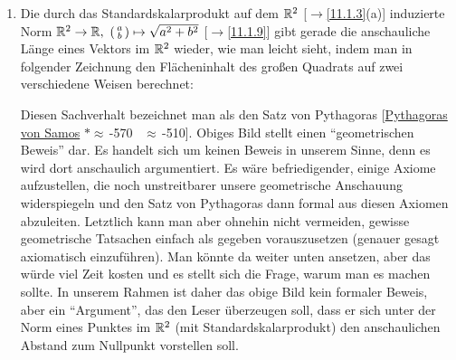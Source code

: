 \documentclass[../../main.tex]{subfiles}
\begin{document}
\begin{bem}\label{11.1.12}
\begin{enumerate}[\normalfont(a)]
\item Die durch das Standardskalarprodukt auf dem $\mathbb R^2$ [$\to$\ref{11.1.3}(a)] induzierte Norm $\R^2\to\R,\ (\begin{smallmatrix}a\\b\end{smallmatrix})\mapsto\sqrt{a^2+b^2}$
[$\to$\ref{11.1.9}]
gibt gerade die anschauliche Länge eines Vektors im $\mathbb R^2$ wieder, wie man leicht sieht, indem man in folgender Zeichnung den Flächeninhalt des großen Quadrats auf
zwei verschiedene Weisen berechnet:
\begin{center}
\end{center}
Diesen Sachverhalt bezeichnet man als den Satz von Pythagoras [\href{http://de.wikipedia.org/wiki/Pythagoras}{Pythagoras von Samos} $*\approx$\,-570 \dag~$\approx$\,-510]. Obiges Bild stellt einen "`geometrischen
Beweis"' dar. Es handelt sich um keinen Beweis in unserem Sinne, denn es wird dort anschaulich argumentiert. Es wäre befriedigender, einige Axiome aufzustellen, die noch unstreitbarer  unsere geometrische Anschauung widerspiegeln und den Satz von Pythagoras dann formal aus diesen Axiomen abzuleiten. Letztlich kann man aber ohnehin
nicht vermeiden, gewisse geometrische Tatsachen einfach als gegeben vorauszusetzen (genauer gesagt axiomatisch einzuführen). Man könnte da weiter unten ansetzen, aber das würde viel Zeit kosten und es stellt sich die Frage, warum man es machen sollte. In unserem Rahmen ist daher das obige Bild kein formaler Beweis, aber ein "`Argument"', das den Leser überzeugen soll, dass er sich unter der Norm eines Punktes im $\mathbb R^2$ (mit Standardskalarprodukt) den anschaulichen Abstand zum Nullpunkt vorstellen soll.

\end{enumerate}
\end{bem}
\end{document}
